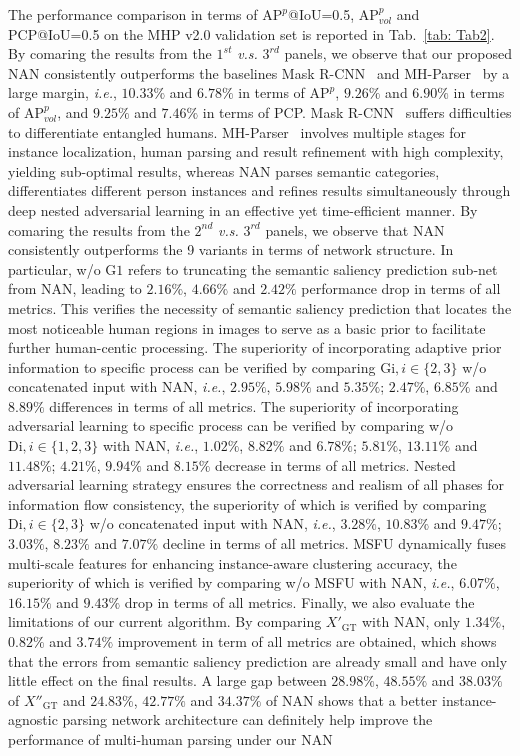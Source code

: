 \documentclass[10pt,twocolumn,letterpaper]{article}
\theoremstyle{definition}
\theoremstyle{remark}
\begin{document}
The performance comparison in terms of $\mathrm{AP}^{p}$@IoU=0.5, $\mathrm{AP}^{p}_{vol}$ and PCP@IoU=0.5 on the MHP v2.0 validation set is reported in Tab.~\ref{tab: Tab2}. By comaring the results from the $1^{st}$ \emph{v.s.} $3^{rd}$ panels, we observe that our proposed NAN consistently outperforms the baselines Mask R-CNN~\cite{he2017mask} and MH-Parser~\cite{li2017towards} by a large margin, \emph{i.e.}, $10.33\%$ and $6.78\%$ in terms of $\mathrm{AP}^{p}$, $9.26\%$ and $6.90\%$ in terms of $\mathrm{AP}^{p}_{vol}$, and $9.25\%$ and $7.46\%$ in terms of PCP. Mask R-CNN~\cite{he2017mask} suffers difficulties to differentiate entangled humans. MH-Parser~\cite{li2017towards} involves multiple stages for instance localization, human parsing and result refinement with high complexity, yielding sub-optimal results, whereas NAN parses semantic categories, differentiates different person instances and refines results simultaneously through deep nested adversarial learning in an effective yet time-efficient manner. By comaring the results from the $2^{nd}$ \emph{v.s.} $3^{rd}$ panels, we observe that NAN consistently outperforms the 9 variants in terms of network structure. In particular, w/o $\mathrm{G1}$ refers to truncating the semantic saliency prediction sub-net from NAN, leading to $2.16\%$, $4.66\%$ and $2.42\%$ performance drop in terms of all metrics. This verifies the necessity of semantic saliency prediction that locates the most noticeable human regions in images to serve as a basic prior to facilitate further human-centic processing. The superiority of incorporating adaptive prior information to specific process can be verified by comparing $\mathrm{Gi}, i\in \{2,3\}$ w/o concatenated input with NAN, \emph{i.e.}, $2.95\%$, $5.98\%$ and $5.35\%$; $2.47\%$, $6.85\%$ and $8.89\%$ differences in terms of all metrics. The superiority of incorporating adversarial learning to specific process can be verified by comparing w/o $\mathrm{Di}, i\in \{1,2,3\}$ with NAN, \emph{i.e.}, $1.02\%$, $8.82\%$ and $6.78\%$; $5.81\%$, $13.11\%$ and $11.48\%$; $4.21\%$, $9.94\%$ and $8.15\%$ decrease in terms of all metrics. Nested adversarial learning strategy ensures the correctness and realism of all phases for information flow consistency, the superiority of which is verified by comparing $\mathrm{Di}, i\in \{2,3\}$ w/o concatenated input with NAN, \emph{i.e.}, $3.28\%$, $10.83\%$ and $9.47\%$; $3.03\%$, $8.23\%$ and $7.07\%$ decline in terms of all metrics. MSFU dynamically fuses multi-scale features for enhancing instance-aware clustering accuracy, the superiority of which is verified by comparing w/o MSFU with NAN, \emph{i.e.}, $6.07\%$, $16.15\%$ and $9.43\%$ drop in terms of all metrics. Finally, we also evaluate the limitations of our current algorithm. By comparing $X{'}_\mathrm{GT}$ with NAN, only $1.34\%$, $0.82\%$ and $3.74\%$ improvement in term of all metrics are obtained, which shows that the errors from semantic saliency prediction are already small and have only little effect on the final results. A large gap between $28.98\%$, $48.55\%$ and $38.03\%$ of $X{''}_\mathrm{GT}$ and $24.83\%$, $42.77\%$ and $34.37\%$ of NAN shows that a better instance-agnostic parsing network architecture can definitely help improve the performance of multi-human parsing under our NAN 
\end{document}
